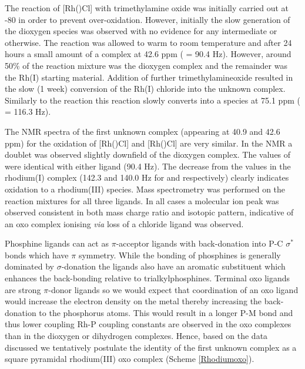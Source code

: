 The reaction of [Rh(\tBuxantphosk)Cl] with trimethylamine oxide was initially carried out at -80 \degC{} in order to prevent over-oxidation.  However, initially the slow generation of the dioxygen species was observed with no evidence for any intermediate or otherwise.  The reaction was allowed to warm to room temperature and after 24 hours a small amount of a complex at 42.6 ppm (\JRhP{} = 90.4 Hz).  However, around 50\%{} of the reaction mixture was the dioxygen complex and the remainder was the Rh(I) starting material.  Addition of further trimethylamineoxide resulted in the slow (1 week) conversion of the Rh(I) chloride into the unknown complex.  Similarly to the \tButhixantphos{} reaction this reaction slowly converts into a species at 75.1 ppm (\JRhP{} = 116.3 Hz).  

The NMR spectra of the first unknown complex (appearing at 40.9 and 42.6 ppm) for the oxidation of [Rh(\tBuxantphosk)Cl] and [Rh(\tButhixantphosk)Cl] are very similar.  In the \phosphorus{} NMR a doublet was observed slightly downfield of the dioxygen complex.  The values of \JRhP{} were identical with either ligand (90.4 Hz).  The decrease from the values in the rhodium(I) complex (142.3 and 140.0 Hz for \tBuxantphos{} and \tButhixantphos{} respectively) clearly indicates oxidation to a rhodium(III) species.  Mass spectrometry was performed on the reaction mixtures for all three \tBuxantphos{} ligands.  In all cases a molecular ion peak was observed consistent in both mass charge ratio and isotopic pattern, indicative of an oxo complex ionising \emph{via} loss of a chloride ligand was observed.

Phosphine ligands can act as $\pi$-acceptor ligands with back-donation into P-C $\sigma^*$ bonds which have $\pi$ symmetry.  While the bonding of \tBu{} phosphines is generally dominated by $\sigma$-donation the \tBuxantphos{} ligands also have an aromatic substituent which enhances the back-bonding relative to trialkylphosphines.  Terminal oxo ligands are strong $\pi$-donor ligands\cite{Betley2008} so we would expect that coordination of an oxo ligand would increase the electron density on the metal thereby increasing the back-donation to the phosphorus atoms.  This would result in a longer P-M bond and thus lower coupling Rh-P coupling constants are observed in the oxo complexes than in the dioxygen or dihydrogen complexes.  Hence, based on the data discussed we tentatively postulate the identity of the first unknown complex as a square pyramidal rhodium(III) oxo complex (Scheme \ref{Rhodiumoxo}).

